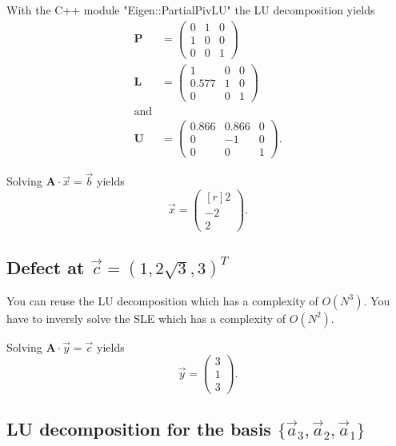 With the C++ module "Eigen::PartialPivLU" the LU decomposition yields
\begin{align}
    \symbf{P} &= 
    \begin{pmatrix}
        0 & 1 & 0 \\
        1 & 0 & 0 \\
        0 & 0 & 1 
    \end{pmatrix} \\
    \symbf{L} &= 
    \begin{pmatrix}
        1 & 0 & 0 \\
        0.577 & 1 & 0 \\
        0 & 0 & 1 
    \end{pmatrix} \\ \text{and} \\
    \symbf{U} &= 
    \begin{pmatrix}
        0.866 & 0.866 & 0 \\
        0 & -1 & 0 \\
        0 & 0 & 1 
    \end{pmatrix} .
\end{align}

Solving $\symbf{A} \cdot \vec{x} = \vec{b}$ yields 
\begin{equation}
    \vec{x} = 
    \begin{pmatrix*}[r]
        2 \\ -2 \\ 2
    \end{pmatrix*} .
\end{equation}

\subsection{Defect at $\vec{c} = (1,2\sqrt{3},3)^T$}

You can reuse the LU decomposition which has a complexity of $O(N^3)$.
You have to inversly solve the SLE which has a complexity of $O(N^2)$.

Solving $\symbf{A} \cdot \vec{y} = \vec{c}$ yields
\begin{equation}
    \vec{y} = 
    \begin{pmatrix}
        3 \\ 1 \\ 3
    \end{pmatrix} .
\end{equation}

\subsection{LU decomposition for the basis $\{\vec{a}_3,\vec{a}_2,\vec{a}_1\}$}

